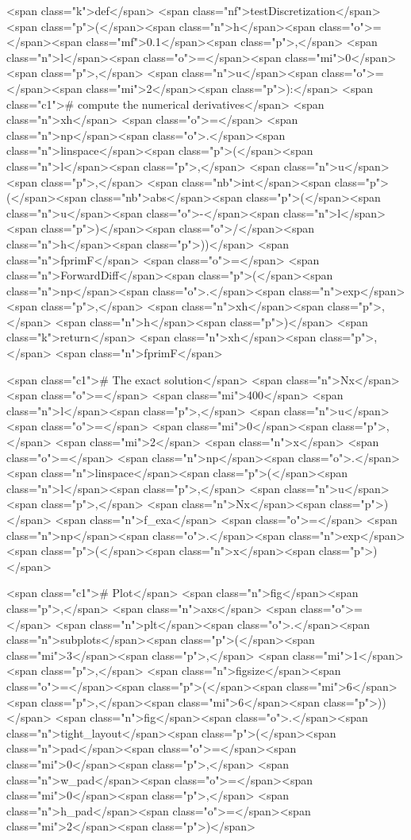 <span class="k">def</span> <span class="nf">testDiscretization</span><span class="p">(</span><span class="n">h</span><span class="o">=</span><span class="mf">0.1</span><span class="p">,</span> <span class="n">l</span><span class="o">=</span><span class="mi">0</span><span class="p">,</span> <span class="n">u</span><span class="o">=</span><span class="mi">2</span><span class="p">):</span>
    <span class="c1"># compute the numerical derivatives</span>
    <span class="n">xh</span> <span class="o">=</span> <span class="n">np</span><span class="o">.</span><span class="n">linspace</span><span class="p">(</span><span class="n">l</span><span class="p">,</span> <span class="n">u</span><span class="p">,</span> <span class="nb">int</span><span class="p">(</span><span class="nb">abs</span><span class="p">(</span><span class="n">u</span><span class="o">-</span><span class="n">l</span><span class="p">)</span><span class="o">/</span><span class="n">h</span><span class="p">))</span>
    <span class="n">fprimF</span> <span class="o">=</span> <span class="n">ForwardDiff</span><span class="p">(</span><span class="n">np</span><span class="o">.</span><span class="n">exp</span><span class="p">,</span> <span class="n">xh</span><span class="p">,</span> <span class="n">h</span><span class="p">)</span>
    <span class="k">return</span> <span class="n">xh</span><span class="p">,</span> <span class="n">fprimF</span>

<span class="c1"># The exact solution</span>
<span class="n">Nx</span> <span class="o">=</span> <span class="mi">400</span>
<span class="n">l</span><span class="p">,</span> <span class="n">u</span> <span class="o">=</span> <span class="mi">0</span><span class="p">,</span> <span class="mi">2</span>
<span class="n">x</span> <span class="o">=</span> <span class="n">np</span><span class="o">.</span><span class="n">linspace</span><span class="p">(</span><span class="n">l</span><span class="p">,</span> <span class="n">u</span><span class="p">,</span> <span class="n">Nx</span><span class="p">)</span>
<span class="n">f_exa</span> <span class="o">=</span> <span class="n">np</span><span class="o">.</span><span class="n">exp</span><span class="p">(</span><span class="n">x</span><span class="p">)</span>

<span class="c1"># Plot</span>
<span class="n">fig</span><span class="p">,</span> <span class="n">axs</span> <span class="o">=</span> <span class="n">plt</span><span class="o">.</span><span class="n">subplots</span><span class="p">(</span><span class="mi">3</span><span class="p">,</span> <span class="mi">1</span><span class="p">,</span> <span class="n">figsize</span><span class="o">=</span><span class="p">(</span><span class="mi">6</span><span class="p">,</span><span class="mi">6</span><span class="p">))</span>
<span class="n">fig</span><span class="o">.</span><span class="n">tight_layout</span><span class="p">(</span><span class="n">pad</span><span class="o">=</span><span class="mi">0</span><span class="p">,</span> <span class="n">w_pad</span><span class="o">=</span><span class="mi">0</span><span class="p">,</span> <span class="n">h_pad</span><span class="o">=</span><span class="mi">2</span><span class="p">)</span>

